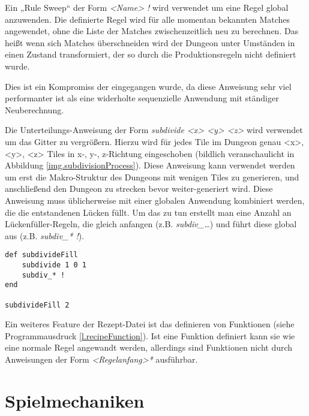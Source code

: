 Ein „Rule Sweep“ der Form \textit{<Name> !} wird verwendet um eine Regel global anzuwenden. Die definierte Regel wird für alle momentan bekannten Matches angewendet, ohne die Liste der Matches zwischenzeitlich neu zu berechnen. Das heißt wenn sich Matches überschneiden wird der Dungeon unter Umständen in einen Zustand transformiert, der so durch die Produktionsregeln nicht definiert wurde. 

Dies ist ein Kompromiss der eingegangen wurde, da diese Anweisung sehr viel performanter ist als eine widerholte sequenzielle Anwendung mit ständiger Neuberechnung. 


Die Unterteilungs-Anweisung der Form \textit{subdivide <x> <y> <z>} wird verwendet um das Gitter zu vergrößern. Hierzu wird für jedes Tile im Dungeon genau <x>, <y>, <z> Tiles in x-, y-, z-Richtung eingeschoben (bildlich veranschaulicht in Abbildung \ref{img.subdivisionProcess}). Diese Anweisung kann verwendet werden um erst die Makro-Struktur des Dungeons mit wenigen Tiles zu generieren, und anschließend den Dungeon zu strecken bevor weiter-generiert wird. 
Diese Anweisung muss üblicherweise mit einer globalen Anwendung kombiniert werden, die die entstandenen Lücken füllt. Um das zu tun erstellt man eine Anzahl an Lückenfüller-Regeln, die gleich anfangen (z.B. \textit{subdiv\_\dots}) und führt diese global aus (z.B. \textit{subdiv\_* !}). \\
\begin{lstlisting}[label=l.recipeFunction, caption={Beispiel einer Funktionsdefinition in der Rezept-Datei}] 
def subdivideFill
    subdivide 1 0 1
    subdiv_* !
end

subdivideFill 2
\end{lstlisting} 
Ein weiteres Feature der Rezept-Datei ist das definieren von Funktionen (siehe Programmausdruck \ref{l.recipeFunction}). Ist eine Funktion definiert kann sie wie eine normale Regel angewandt werden, allerdings sind Funktionen nicht durch Anweisungen der Form \textit{<Regelanfang>*} ausführbar.


\section{Spielmechaniken}\label{s.spielmechaniken}

